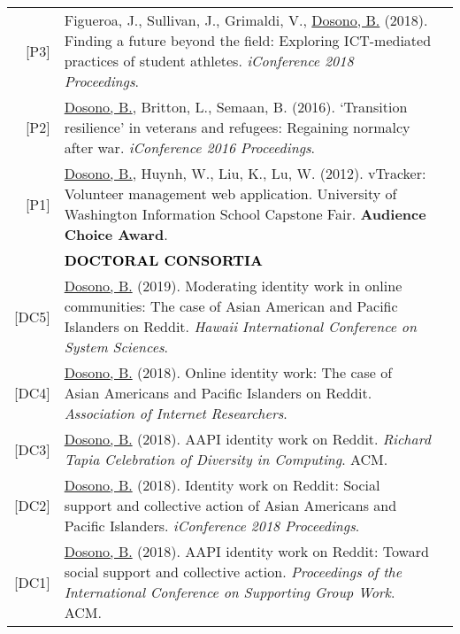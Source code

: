 \documentclass[11pt]{article}
\begin{document}
{{\begin{longtable}{Rp{0.75in}p{5.0in}}
\footnotesize{[P3]} & Figueroa, J., Sullivan, J., Grimaldi, V., \href{https://www.ideals.illinois.edu/handle/2142/100251}{{Dosono, B.}} (2018). Finding a future beyond the field: Exploring ICT-mediated practices of student athletes. \textit{iConference 2018 Proceedings}.\\

\footnotesize{[P2]} & \href{https://doi.org/10.9776/16575}{{Dosono, B.}}, Britton, L., Semaan, B. (2016). `Transition resilience' in veterans and refugees: Regaining normalcy after war. \textit{iConference 2016 Proceedings}.\\

\footnotesize{[P1]} & \href{http://youtu.be/i5US90lHIac}{{Dosono, B.}}, Huynh, W., Liu, K., Lu, W. (2012). vTracker: Volunteer management web application. University of Washington Information School Capstone Fair. \textbf{Audience Choice Award}.\\

& \textcolor{black}{\uppercase{\textbf{Doctoral Consortia}}}\\

\footnotesize{[DC5]} 
& \href{http://hicss.hawaii.edu/doctoral-consortium/}{{Dosono, B.}} (2019). Moderating identity work in online communities: The case of Asian American and Pacific Islanders on Reddit. \textit{Hawaii International Conference on System Sciences}.\\

\footnotesize{[DC4]} & \href{https://web.archive.org/web/20210309183350/https://aoir2018.sched.com/event/HPAQ/doctoral-colloquium}{{Dosono, B.}} (2018). Online identity work: The case of Asian Americans and Pacific Islanders on Reddit. \textit{Association of Internet Researchers}.\\

\footnotesize{[DC3]} & \href{https://tapiaconference.cmd-it.org/wp-content/uploads/2020/06/Tapia-Conference-2018-Program.pdf}{{Dosono, B.}} (2018). AAPI identity work on Reddit. \textit{Richard Tapia Celebration of Diversity in Computing}. ACM.\\

\footnotesize{[DC2]} & \href{https://ischools.org/the-iconference/program/doctoral-colloquium/2018-doctoral-colloquium/}{{Dosono, B.}} (2018). Identity work on Reddit: Social support and collective action of Asian Americans and Pacific Islanders. \textit{iConference 2018 Proceedings}.\\

\footnotesize{[DC1]} & \href{https://dl.acm.org/authorize?N42808}{{Dosono, B.}} (2018). AAPI identity work on Reddit: Toward social support and collective action. \textit{Proceedings of the International Conference on Supporting Group Work}. ACM.\\


\end{longtable}}}
\end{document}
